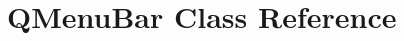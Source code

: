\hypertarget{classGUI_1_1QtGui_1_1QMenuBar}{}\section{Q\+Menu\+Bar Class Reference}
\label{classGUI_1_1QtGui_1_1QMenuBar}
